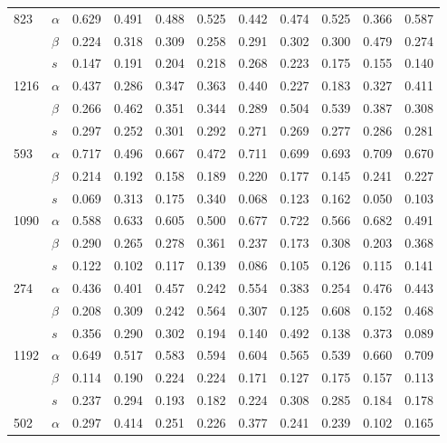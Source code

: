 \begin{longtable}{llrrrrrrrrr}
\cline{1-11}
\multirow{3}{*}{823} & $\alpha$ & 0.629 & 0.491 & 0.488 & 0.525 & 0.442 & 0.474 & 0.525 & 0.366 & 0.587 \\
     & $\beta$ & 0.224 & 0.318 & 0.309 & 0.258 & 0.291 & 0.302 & 0.300 & 0.479 & 0.274 \\
     & $s$ & 0.147 & 0.191 & 0.204 & 0.218 & 0.268 & 0.223 & 0.175 & 0.155 & 0.140 \\
\cline{1-11}
\multirow{3}{*}{1216} & $\alpha$ & 0.437 & 0.286 & 0.347 & 0.363 & 0.440 & 0.227 & 0.183 & 0.327 & 0.411 \\
     & $\beta$ & 0.266 & 0.462 & 0.351 & 0.344 & 0.289 & 0.504 & 0.539 & 0.387 & 0.308 \\
     & $s$ & 0.297 & 0.252 & 0.301 & 0.292 & 0.271 & 0.269 & 0.277 & 0.286 & 0.281 \\
\cline{1-11}
\multirow{3}{*}{593} & $\alpha$ & 0.717 & 0.496 & 0.667 & 0.472 & 0.711 & 0.699 & 0.693 & 0.709 & 0.670 \\
     & $\beta$ & 0.214 & 0.192 & 0.158 & 0.189 & 0.220 & 0.177 & 0.145 & 0.241 & 0.227 \\
     & $s$ & 0.069 & 0.313 & 0.175 & 0.340 & 0.068 & 0.123 & 0.162 & 0.050 & 0.103 \\
\cline{1-11}
\multirow{3}{*}{1090} & $\alpha$ & 0.588 & 0.633 & 0.605 & 0.500 & 0.677 & 0.722 & 0.566 & 0.682 & 0.491 \\
     & $\beta$ & 0.290 & 0.265 & 0.278 & 0.361 & 0.237 & 0.173 & 0.308 & 0.203 & 0.368 \\
     & $s$ & 0.122 & 0.102 & 0.117 & 0.139 & 0.086 & 0.105 & 0.126 & 0.115 & 0.141 \\
\cline{1-11}
\multirow{3}{*}{274} & $\alpha$ & 0.436 & 0.401 & 0.457 & 0.242 & 0.554 & 0.383 & 0.254 & 0.476 & 0.443 \\
     & $\beta$ & 0.208 & 0.309 & 0.242 & 0.564 & 0.307 & 0.125 & 0.608 & 0.152 & 0.468 \\
     & $s$ & 0.356 & 0.290 & 0.302 & 0.194 & 0.140 & 0.492 & 0.138 & 0.373 & 0.089 \\
\cline{1-11}
\multirow{3}{*}{1192} & $\alpha$ & 0.649 & 0.517 & 0.583 & 0.594 & 0.604 & 0.565 & 0.539 & 0.660 & 0.709 \\
     & $\beta$ & 0.114 & 0.190 & 0.224 & 0.224 & 0.171 & 0.127 & 0.175 & 0.157 & 0.113 \\
     & $s$ & 0.237 & 0.294 & 0.193 & 0.182 & 0.224 & 0.308 & 0.285 & 0.184 & 0.178 \\
\cline{1-11}
\multirow{3}{*}{502} & $\alpha$ & 0.297 & 0.414 & 0.251 & 0.226 & 0.377 & 0.241 & 0.239 & 0.102 & 0.165 \\

\end{longtable}
